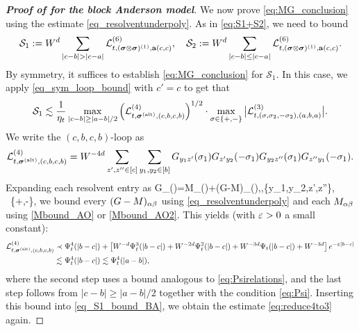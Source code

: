 \begin{proof}[\bf Proof of  for the block Anderson model]
We now prove \eqref{eq:MG_conclusion} using the estimate \eqref{eq_resolventunderpoly}. As in \eqref{eq:S1+S2}, we need to bound 
\[\cal S_1:= W^d \sum_{|c-b|> |c-a|}  \mathcal{L}^{(6)}_{t, (\bsig\otimes \bsig)^{(1)}, \ba(c,c)},\quad \cal S_2:= W^d \sum_{|c-b|\le |c-a|} \mathcal{L}^{(6)}_{t, (\bsig\otimes \bsig)^{(1)}, \ba(c,c)}. \]
By symmetry, it suffices to establish \eqref{eq:MG_conclusion} for $\mathcal{S}_1$. %
In this case, we apply \eqref{eq_sym_loop_bound} with $c'=c$ to get that 
\begin{equation}\label{eq_S1_bound_BA}
    \mathcal{S}_1 \lesssim \frac{1}{\eta_t}\max_{|c-b| \ge |a-b|/2} \left(\mathcal{L}^{(4)}_{t,\bsig^{(\alt)}, (c,b,c,b)}\right)^{1/2} \cdot  \max_{\sig\in\{+,-\}} \big|\mathcal{L}^{(3)}_{t, (\sigma,\sig_2,-\sig_2), (a,b,a)} \big|. %
\end{equation}
We write the $(c,b,c,b)$-loop as 
\[\mathcal{L}^{(4)}_{t,{\boldsymbol{\sigma}}^{(\mathrm{alt})}, (c,b,c,b)}=W^{-4d} \sum_{z',z''\in[c]}\sum_{y_1,y_2\in [b]} G_{y_1 z'}(\sigma_1) G_{z'y_2}(-\sigma_1) G_{y_2 z''} (\sigma_1)G_{z''y_1}(-\sigma_1).\]
Expanding each resolvent entry as 
\be\label{eq:G+G-M}
G_{\al \beta}(\sig)=M_{\al \beta}(\sig)+(G-M)_{\al\beta}(\sig),\quad \forall \al,\beta\in \{y_1,y_2,z',z''\}, \ \sig\in\{+,-\},\ee 
we bound every $(G-M)_{\alpha\beta}$ using \eqref{eq_resolventunderpoly} and each $M_{\alpha \beta}$ using \eqref{Mbound_AO} or \eqref{Mbound_AO2}. This yields (with ${\varepsilon}>0$ a small constant): 
\begin{align*}
   \mathcal{L}^{(4)}_{t,{\boldsymbol{\sigma}}^{(\mathrm{alt})}, (c,b,c,b)} &\prec \Psi_t^4(|b-c|)+\left[{W^{-d}\Psi_t^3(|b-c|)+ W^{-2d}\Psi_t^2(|b-c|) + W^{-3d}\Psi_t(|b-c|)+W^{-3d}}\right] e^{-{\varepsilon}|b-c|} \\
  & \lesssim \Psi_t^4(|b-c|) \lesssim \Psi_t^4(|a-b|),
\end{align*}
where the second step uses a bound analogous to \eqref{eq:Psirelations}, and the last step follows from $|c-b|\ge |a-b|/2$ together with the condition \eqref{eq:Psi}. 
Inserting this bound into \eqref{eq_S1_bound_BA}, we obtain the estimate \eqref{eq:reduce4to3} again.

\end{proof}
